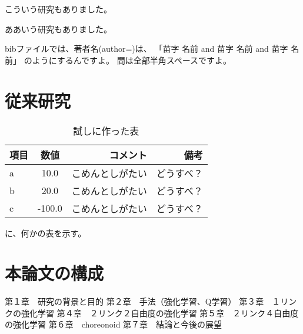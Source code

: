         こういう研究\cite{Ikuo:doctor}もありました。

        ああいう研究\cite{Hondo:JRSJ2011}もありました。

        bibファイルでは、著者名(author=)は、
        「苗字 名前 and 苗字 名前 and 苗字 名前」
        のようにするんですよ\cite{Mizuuchi:RSJ2015-baneoid}。
        間は全部半角スペースですよ。

        \section{従来研究}

        \begin{table}[tb]
          \begin{center}
            \caption{試しに作った表}
            \begin{tabular}{l|c|r|r}
              \hline
              項目 & 数値 & コメント & 備考 \\
              \hline
              a & 10.0 & こめんとしがたい & どうすべ？\\
              b & 20.0 & こめんとしがたい & どうすべ？\\
              c & -100.0 & こめんとしがたい & どうすべ？\\
              \hline
            \end{tabular}
          \end{center}
        \end{table}

        に、何かの表を示す。

        \section{本論文の構成}

        第１章　研究の背景と目的
        第２章　手法（強化学習、Q学習）
        第３章　１リンクの強化学習
        第４章　２リンク２自由度の強化学習
        第５章　２リンク４自由度の強化学習
        第６章　choreonoid
        第７章　結論と今後の展望
